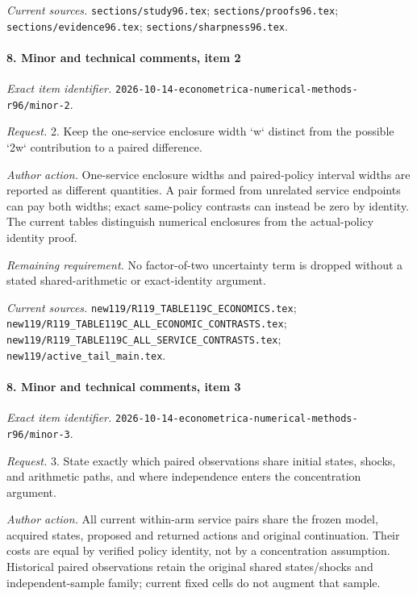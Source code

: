 \par\emph{Current sources.} \nolinkurl{sections/study96.tex}; \nolinkurl{sections/proofs96.tex}; \nolinkurl{sections/evidence96.tex}; \nolinkurl{sections/sharpness96.tex}.

\paragraph{8. Minor and technical comments, item 2}

\emph{Exact item identifier.} \nolinkurl{2026-10-14-econometrica-numerical-methods-r96/minor-2}.

\par\emph{Request.} 2. Keep the one-service enclosure width `w` distinct from the possible `2w` contribution to a paired difference.

\par\emph{Author action.} One-service enclosure widths and paired-policy interval widths are reported as different quantities. A pair formed from unrelated service endpoints can pay both widths; exact same-policy contrasts can instead be zero by identity. The current tables distinguish numerical enclosures from the actual-policy identity proof.

\par\emph{Remaining requirement.} No factor-of-two uncertainty term is dropped without a stated shared-arithmetic or exact-identity argument.

\par\emph{Current sources.} \nolinkurl{new119/R119_TABLE119C_ECONOMICS.tex}; \nolinkurl{new119/R119_TABLE119C_ALL_ECONOMIC_CONTRASTS.tex}; \nolinkurl{new119/R119_TABLE119C_ALL_SERVICE_CONTRASTS.tex}; \nolinkurl{new119/active_tail_main.tex}.

\paragraph{8. Minor and technical comments, item 3}

\emph{Exact item identifier.} \nolinkurl{2026-10-14-econometrica-numerical-methods-r96/minor-3}.

\par\emph{Request.} 3. State exactly which paired observations share initial states, shocks, and arithmetic paths, and where independence enters the concentration argument.

\par\emph{Author action.} All current within-arm service pairs share the frozen model, acquired states, proposed and returned actions and original continuation. Their costs are equal by verified policy identity, not by a concentration assumption. Historical paired observations retain the original shared states/\allowbreak{}shocks and independent-sample family; current fixed cells do not augment that sample.


